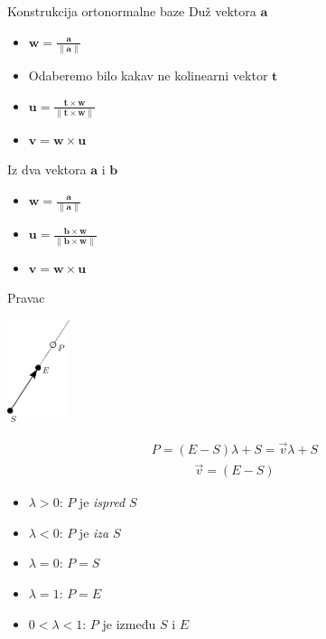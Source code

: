 \documentclass[9pt]{beamer}
\begin{document}
\begin{frame}{Konstrukcija ortonormalne baze}
	Duž vektora $\mathbf{a}$ 
	\begin{itemize}
		\item $\mathbf{w} = \frac{\mathbf{a}}{\lVert\mathbf{a}\rVert}$
		\item Odaberemo bilo kakav ne kolinearni vektor $\mathbf{t}$
		\item $\mathbf{u} = \frac{\mathbf{t}\times \mathbf{w}}{\lVert\mathbf{t}\times \mathbf{w}\rVert}$
		\item $\mathbf{v} = \mathbf{w}\times \mathbf{u}$
	\end{itemize}
	Iz dva vektora  $\mathbf{a}$  i  $\mathbf{b}$ 
	\begin{itemize}
		\item $\mathbf{w} = \frac{\mathbf{a}}{\lVert\mathbf{a}\rVert}$
		\item $\mathbf{u} = \frac{\mathbf{b}\times \mathbf{w}}{\lVert\mathbf{b}\times \mathbf{w}\rVert}$
		\item $\mathbf{v} = \mathbf{w}\times \mathbf{u}$
	\end{itemize}
\end{frame}
	
\begin{frame}{Pravac}
	\begin{center}
		\includegraphics[height=3cm]{./slike/linear_algebra_pravci.png}
	\end{center}
	\begin{align*}
		P = (E-S)\lambda + S = \vec{v}\lambda + S
	\end{align*}
	\begin{align*}
	\vec{v} = (E-S)
	\end{align*}
	
	\begin{itemize}
		\item $\lambda > 0$: $P$ je \textit{ispred} $S$
		\item $\lambda < 0$: $P$ je \textit{iza} $S$
		\item $\lambda = 0$: $P = S$
		\item $\lambda = 1$: $P = E$
		\item $0 < \lambda < 1$: $P$ je između $S$ i $E$
	\end{itemize}
\end{frame}
\end{document}
